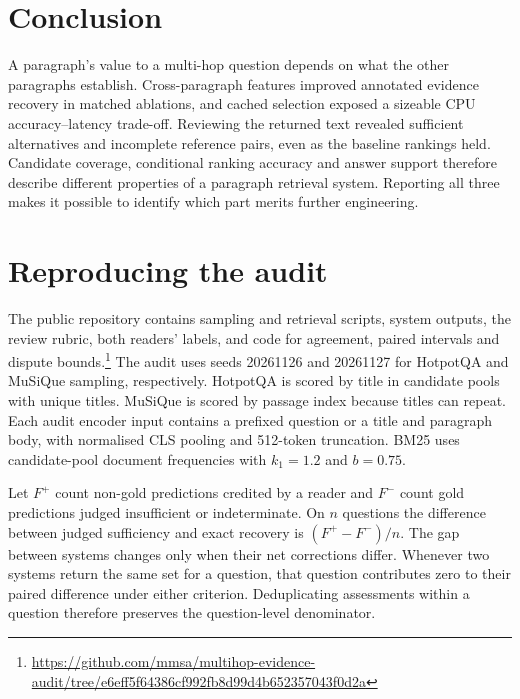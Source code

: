 \documentclass[twoside,a4paper,11pt]{article}
\begin{document}
\section{Conclusion}
A paragraph's value to a multi-hop question depends on what the other paragraphs establish. Cross-paragraph features improved annotated evidence recovery in matched ablations, and cached selection exposed a sizeable CPU accuracy--latency trade-off. Reviewing the returned text revealed sufficient alternatives and incomplete reference pairs, even as the baseline rankings held. Candidate coverage, conditional ranking accuracy and answer support therefore describe different properties of a paragraph retrieval system. Reporting all three makes it possible to identify which part merits further engineering.

\appendix
\section{Reproducing the audit}
The public repository contains sampling and retrieval scripts, system outputs, the review rubric, both readers' labels, and code for agreement, paired intervals and dispute bounds.\footnote{\url{https://github.com/mmsa/multihop-evidence-audit/tree/e6eff5f64386cf992fb8d99d4b652357043f0d2a}} The audit uses seeds 20261126 and 20261127 for HotpotQA and MuSiQue sampling, respectively. HotpotQA is scored by title in candidate pools with unique titles. MuSiQue is scored by passage index because titles can repeat. Each audit encoder input contains a prefixed question or a title and paragraph body, with normalised CLS pooling and 512-token truncation. BM25 uses candidate-pool document frequencies with $k_1=1.2$ and $b=0.75$.

Let $F^+$ count non-gold predictions credited by a reader and $F^-$ count gold predictions judged insufficient or indeterminate. On $n$ questions the difference between judged sufficiency and exact recovery is $(F^+-F^-)/n$. The gap between systems changes only when their net corrections differ. Whenever two systems return the same set for a question, that question contributes zero to their paired difference under either criterion. Deduplicating assessments within a question therefore preserves the question-level denominator.


\end{document}
